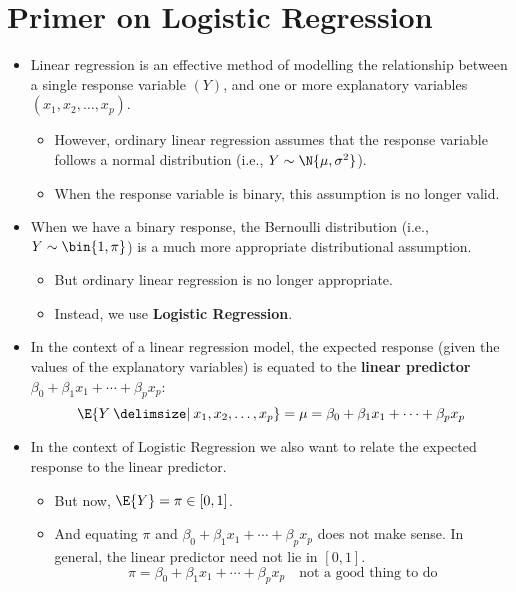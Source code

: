 \section*{Primer on Logistic Regression}
\begin{itemize}
      \item Linear regression is an effective method of modelling the relationship between a single response variable
            $ (Y) $, and one or more explanatory variables $ (x_1,x_2,\ldots,x_p) $.
            \begin{itemize}
                  \item However, ordinary linear regression assumes that the response variable follows a normal distribution
                        (i.e., $ Y \sim \N{\mu,\sigma^2} $).
                  \item When the response variable is binary, this assumption is no longer valid.
            \end{itemize}
      \item When we have a binary response, the Bernoulli distribution (i.e., $ Y \sim \bin{1,\pi} $) is a much more
            appropriate distributional assumption.
            \begin{itemize}
                  \item But ordinary linear regression is no longer appropriate.
                  \item Instead, we use \textbf{Logistic Regression}.
            \end{itemize}
      \item In the context of a linear regression model, the expected response (given
            the values of the explanatory variables) is equated to the \textbf{linear predictor} $ \beta_0+\beta_1x_1+\cdots+\beta_p x_p $:
            \[ \E{Y\given x_1,x_2,\ldots,x_p}=\mu=\beta_0+\beta_1x_1+\cdots+\beta_p x_p \]
      \item In the context of Logistic Regression we also want to relate the expected response to the linear predictor.
            \begin{itemize}
                  \item But now, $ \E{Y}=\pi\in[0,1] $.
                  \item And equating $ \pi $ and $ \beta_0+\beta_1 x_1+\cdots+\beta_p x_p $ does not make sense. In general, the linear predictor need not lie in $ [0,1] $.
                        \[ \pi=\beta_0+\beta_1x_1+\cdots+\beta_p x_p\quad\text{not a good thing to do} \]
            \end{itemize}

\end{itemize}
